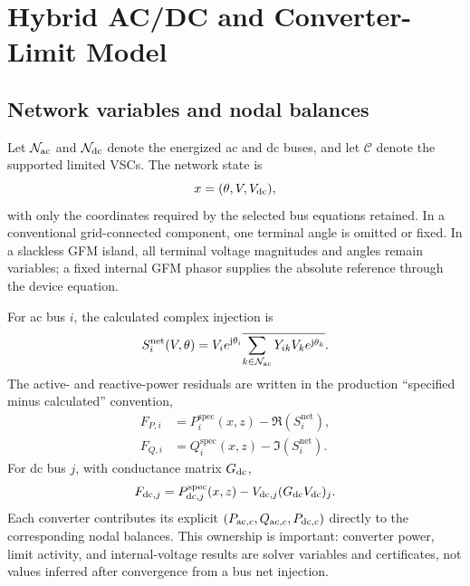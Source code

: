 \section{Hybrid AC/DC and Converter-Limit Model}\label{sec:model}

\subsection{Network variables and nodal balances}

Let $\mathcal N_{\mathrm{ac}}$ and $\mathcal N_{\mathrm{dc}}$ denote the energized ac and dc
buses, and let $\mathcal C$ denote the supported limited VSCs. The network
state is
\begin{equation}
 x=(\theta,V,V_{\mathrm{dc}}),
\end{equation}
with only the coordinates required by the selected bus equations retained.
In a conventional grid-connected component, one terminal angle is omitted or
fixed. In a slackless GFM island, all terminal voltage magnitudes and angles
remain variables; a fixed internal GFM phasor supplies the absolute reference
through the device equation.

For ac bus $i$, the calculated complex injection is
\begin{equation}
 S_i^{\mathrm{net}}(V,\theta)
 =V_i e^{\mathrm j\theta_i}
  \overline{\sum_{k\in\mathcal N_{\mathrm{ac}}}
  Y_{ik}V_k e^{\mathrm j\theta_k}}.
\end{equation}
The active- and reactive-power residuals are written in the production
``specified minus calculated'' convention,
\begin{subequations}\label{eq:ac-balances}
\begin{align}
 F_{P,i} &= P_i^{\mathrm{spec}}(x,z)-\Re(S_i^{\mathrm{net}}),\\
 F_{Q,i} &= Q_i^{\mathrm{spec}}(x,z)-\Im(S_i^{\mathrm{net}}).
\end{align}
\end{subequations}
For dc bus $j$, with conductance matrix $G_{\mathrm{dc}}$,
\begin{equation}
 F_{\mathrm{dc},j}=P_{\mathrm{dc},j}^{\mathrm{spec}}(x,z)
 -V_{\mathrm{dc},j}(G_{\mathrm{dc}}V_{\mathrm{dc}})_j.
 \label{eq:dc-balance}
\end{equation}
Each converter contributes its explicit $(P_{\mathrm{ac},c},Q_{\mathrm{ac},c},P_{\mathrm{dc},c})$
directly to the corresponding nodal balances. This ownership is important:
converter power, limit activity, and internal-voltage results are solver
variables and certificates, not values inferred after convergence from a bus
net injection.

